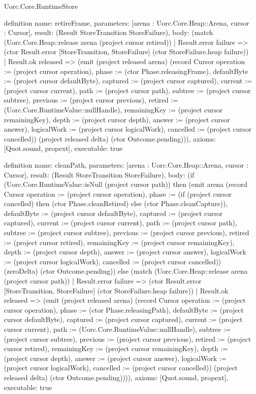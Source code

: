 \begin{lexlean}{Uorc.Core.RuntimeStore}
\begin{semanticmodule}
definition{
  name: retireFrame,
  parameters: [arena : Uorc.Core.Heap::Arena, cursor : Cursor],
  result: (Result StoreTransition StoreFailure),
  body: (match (Uorc.Core.Heap::release arena (project cursor retired))
    | Result.error failure => (ctor Result.error [StoreTransition, StoreFailure] (ctor StoreFailure.heap failure))
    | Result.ok released => (emit (project released arena) (record Cursor {operation := (project cursor operation), phase := (ctor Phase.releasingFrame), defaultByte := (project cursor defaultByte), captured := (project cursor captured), current := (project cursor current), path := (project cursor path), subtree := (project cursor subtree), previous := (project cursor previous), retired := (Uorc.Core.RuntimeValue::nullHandle), remainingKey := (project cursor remainingKey), depth := (project cursor depth), answer := (project cursor answer), logicalWork := (project cursor logicalWork), cancelled := (project cursor cancelled)}) (project released delta) (ctor Outcome.pending))),
  axioms: [Quot.sound, propext],
  executable: true
}

definition{
  name: cleanPath,
  parameters: [arena : Uorc.Core.Heap::Arena, cursor : Cursor],
  result: (Result StoreTransition StoreFailure),
  body: (if (Uorc.Core.RuntimeValue::isNull (project cursor path)) then (emit arena (record Cursor {operation := (project cursor operation), phase := (if (project cursor cancelled) then (ctor Phase.cleanRetired) else (ctor Phase.cleanCapture)), defaultByte := (project cursor defaultByte), captured := (project cursor captured), current := (project cursor current), path := (project cursor path), subtree := (project cursor subtree), previous := (project cursor previous), retired := (project cursor retired), remainingKey := (project cursor remainingKey), depth := (project cursor depth), answer := (project cursor answer), logicalWork := (project cursor logicalWork), cancelled := (project cursor cancelled)}) (zeroDelta) (ctor Outcome.pending)) else (match (Uorc.Core.Heap::release arena (project cursor path))
    | Result.error failure => (ctor Result.error [StoreTransition, StoreFailure] (ctor StoreFailure.heap failure))
    | Result.ok released => (emit (project released arena) (record Cursor {operation := (project cursor operation), phase := (ctor Phase.releasingPath), defaultByte := (project cursor defaultByte), captured := (project cursor captured), current := (project cursor current), path := (Uorc.Core.RuntimeValue::nullHandle), subtree := (project cursor subtree), previous := (project cursor previous), retired := (project cursor retired), remainingKey := (project cursor remainingKey), depth := (project cursor depth), answer := (project cursor answer), logicalWork := (project cursor logicalWork), cancelled := (project cursor cancelled)}) (project released delta) (ctor Outcome.pending)))),
  axioms: [Quot.sound, propext],
  executable: true
}


\end{semanticmodule}
\end{lexlean}
